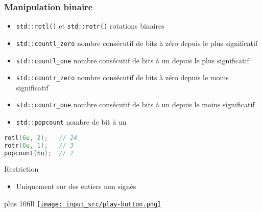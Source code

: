 \documentclass[C++.tex]{subfiles}
\begin{document}
\begin{frame}[fragile]
	\frametitle{Manipulation binaire}
	\begin{itemize}
		\item \lstinline|std::rotl()| et \lstinline|std::rotr()| rotations binaires


		\item \lstinline|std::countl_zero| nombre consécutif de bits à zéro depuis le plus significatif
		\item \lstinline|std::countl_one| nombre consécutif de bits à un depuis le plus significatif
		\item \lstinline|std::countr_zero| nombre consécutif de bits à zéro depuis le moins significatif
		\item \lstinline|std::countr_one| nombre consécutif de bits à un depuis le moins significatif
		\item \lstinline|std::popcount| nombre de bit à un
	\end{itemize}

	\begin{lstlisting}[language=C++]
rotl(6u, 2);   // 24
rotr(6u, 1);   // 3
popcount(6u);  // 2\end{lstlisting}

	\begin{alertblock}{Restriction}
		\begin{itemize}
			\item Uniquement sur des entiers non signés
		\end{itemize}
	\end{alertblock}

	\vskip 10mm plus 10fill
	\hfill
	\href{https://godbolt.org/#g:!((g:!((g:!((h:codeEditor,i:(filename:'1',fontScale:14,fontUsePx:'0',j:1,lang:c%2B%2B,selection:(endColumn:1,endLineNumber:9,positionColumn:1,positionLineNumber:9,selectionStartColumn:1,selectionStartLineNumber:6,startColumn:1,startLineNumber:6),source:'%23include+%3Ciostream%3E%0A%23include+%3Cbit%3E%0A%0Aint+main()%0A%7B%0A++std::cout+%3C%3C+std::rotl(6u,+2)+%3C%3C+%22%5Cn%22%3B%0A++std::cout+%3C%3C+std::rotr(6u,+1)+%3C%3C+%22%5Cn%22%3B%0A++std::cout+%3C%3C+std::popcount(6u)+%3C%3C+%22%5Cn%22%3B%0A%7D%0A'),l:'5',n:'0',o:'C%2B%2B+source+%231',t:'0')),k:50,l:'4',n:'0',o:'',s:0,t:'0'),(g:!((h:executor,i:(argsPanelShown:'1',compilationPanelShown:'0',compiler:g122,compilerName:'',compilerOutShown:'0',execArgs:'',execStdin:'',fontScale:14,fontUsePx:'0',j:1,lang:c%2B%2B,libs:!((name:boost,ver:'175')),options:'-std%3Dc%2B%2B20+-Wall+-Wextra+-pedantic',source:1,stdinPanelShown:'1',tree:'1',wrap:'0'),l:'5',n:'0',o:'Executor+x86-64+gcc+12.2+(C%2B%2B,+Editor+%231)',t:'0')),header:(),k:50,l:'4',n:'0',o:'',s:0,t:'0')),l:'2',n:'0',o:'',t:'0')),version:4}{\texttt{[image: input\_src/play-button.png]}}
\end{frame}
\end{document}
